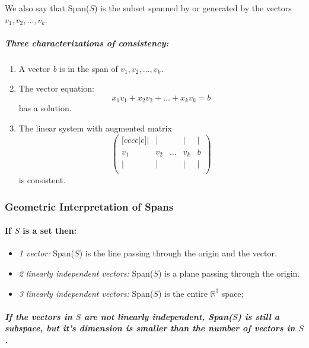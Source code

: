 \documentclass[a4paper,12pt]{article}
\begin{document}
We also say that Span(\(S\)) is the subset spanned by or generated by the vectors \(v_1, v_2,\dots, v_k\).

\newpage
\subparagraph{Three characterizations of consistency:}
\begin{enumerate}
    \item A vector \textit{b} is in the span of \textit{\(v_1, v_2,\dots, v_k\)}.
    \item The vector equation: 
    \[
    x_1v_1 + x_2v_2 + \dots + x_kv_k = b
    \]
    has a solution.
    \item The linear system with augmented matrix \begin{equation} \begin{pmatrix} [cccc|c] | & | &  & | & | \\
   v_1 & v_2 & \dots & v_k & b \\
   | & | &  & | & | \\
\end{pmatrix}
\end{equation}
    is consistent.
\end{enumerate}

\subsubsection{Geometric Interpretation of Spans}


\paragraph{If \(S\) is a set then:\\} 
\begin{itemize}
    \item \textit{1 vector:} Span(\(S\)) is the line passing through the origin and the vector.\\
    \item \textit{2 linearly independent vectors:} Span(\(S\)) is a plane passing through the origin.\\
    \item \textit{3 linearly independent vectors:} Span(\(S\)) is the entire  \(\mathbb{R}^3\) space;\\
\end{itemize}

\subparagraph{If the vectors in \(S\) are not linearly independent, Span(\(S\)) is still a subspace, but it's dimension is smaller than the number of vectors in \(S\).}
\end{document}
